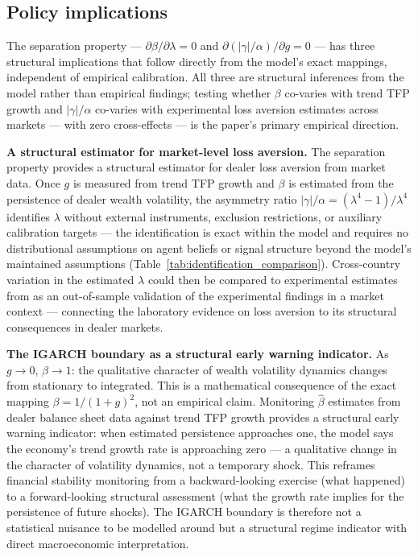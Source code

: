 \documentclass[12pt,a4paper]{article}
\theoremstyle{definition}
\begin{document}
\subsection{Policy implications}
\label{sec:policy}

The separation property --- $\partial\beta/\partial\lambda = 0$ and
$\partial(|\gamma|/\alpha)/\partial g = 0$ --- has three structural
implications that follow directly from the model's exact mappings,
independent of empirical calibration. All three are structural inferences
from the model rather than empirical findings; testing whether $\beta$
co-varies with trend TFP growth and $|\gamma|/\alpha$ co-varies with
experimental loss aversion estimates across markets --- with zero
cross-effects --- is the paper's primary empirical direction.

\noindent\textbf{A structural estimator for market-level loss aversion.}
The separation property provides a structural estimator for dealer loss
aversion from market data. Once $g$ is measured from trend TFP growth
and $\beta$ is estimated from the persistence of dealer wealth volatility,
the asymmetry ratio $|\gamma|/\alpha = (\lambda^4-1)/\lambda^4$ identifies
$\lambda$ without external instruments, exclusion restrictions, or
auxiliary calibration targets --- the identification is exact within the
model and requires no distributional assumptions on agent beliefs or
signal structure beyond the model's maintained assumptions
(Table~\ref{tab:identification_comparison}). Cross-country variation in
the estimated $\lambda$ could then be compared to experimental estimates
from \citet{wang2017} as an out-of-sample validation of the experimental
findings in a market context --- connecting the laboratory evidence on
loss aversion to its structural consequences in dealer markets.

\noindent\textbf{The IGARCH boundary as a structural early warning indicator.}
As $g \to 0$, $\beta \to 1$: the qualitative character of wealth volatility
dynamics changes from stationary to integrated. This is a mathematical
consequence of the exact mapping $\beta = 1/(1+g)^2$, not an empirical
claim. Monitoring $\hat{\beta}$ estimates from dealer balance sheet data
against trend TFP growth provides a structural early warning indicator:
when estimated persistence approaches one, the model says the economy's
trend growth rate is approaching zero --- a qualitative change in the
character of volatility dynamics, not a temporary shock. This reframes
financial stability monitoring from a backward-looking exercise (what
happened) to a forward-looking structural assessment (what the growth
rate implies for the persistence of future shocks). The IGARCH boundary
is therefore not a statistical nuisance to be modelled around but a
structural regime indicator with direct macroeconomic interpretation.
\end{document}
